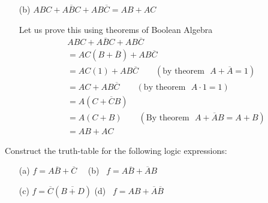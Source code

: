 \begin{solution}
\begin{itemize}
\item[(b)] $ABC+A\overline{B}C+AB\overline{C}=AB+AC$

Let us prove this using theorems of Boolean Algebra
\begin{align*}
& ABC+A\overline{B}C+AB\overline{C}\\[2pt]
&= AC(B+\overline{B})+AB\overline{C}\\[2pt]
&= AC(1)+AB\overline{C}\qquad (\text{by theorem~ } A+\overline{A}=1)\\[2pt]
&= AC+AB\overline{C}\qquad (\text{by theorem~ } A\cdot 1=1)\\[2pt]
&= A(C+\overline{C}B)\\[2pt]
&= A(C+B)\qquad (\text{By theorem~ } A+\overline{A}B=A+B)\\[2pt]
&= AB+AC
\end{align*}
\end{itemize}
\vskip -1.2cm
\end{solution}

\medskip
\begin{example}\label{exam6.26}
Construct the truth-table for the following logic expressions:
\begin{itemize}
\itemsep=0pt
\item[(a)] $f=A\overline{B}+\overline{C}$\qquad\qquad~~ 
(b)~ $f=A\overline{B}+\overline{A}B$

\item[(c)] $f=\overline{C}(\overline{B+D})$\qquad\qquad
(d)~ $f=AB+\overline{A}\overline{B}$
\end{itemize}
\end{example}


